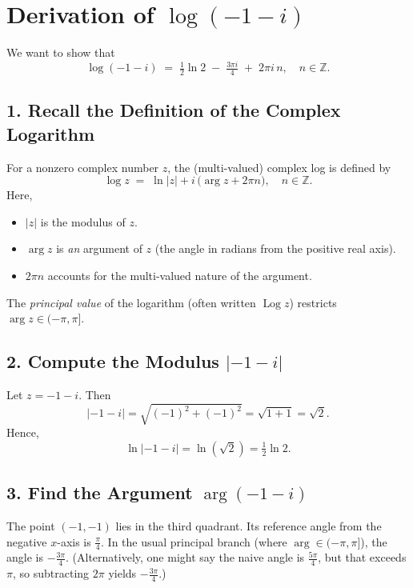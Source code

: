 \documentclass[12pt]{article}
\title{}
\author{Jerich Lee}
\date{\today}
\DeclareMathOperator{\Log}{Log}
\theoremstyle{definition} %
\theoremstyle{plain} %
\begin{document}
\maketitle
\section*{Derivation of \(\log(-1 - i)\)}

We want to show that
\[
\log(-1 - i) \;=\; \tfrac12 \ln 2 \;-\; \tfrac{3\pi i}{4} \;+\; 2\pi i\,n,
\quad n \in \mathbb{Z}.
\]

\subsection*{1. Recall the Definition of the Complex Logarithm}
For a nonzero complex number \(z\), the (multi-valued) complex log is defined by
\[
\log z \;=\; \ln |z| + i\,\bigl(\arg z + 2\pi n\bigr),
\quad n \in \mathbb{Z}.
\]
Here,
\begin{itemize}
  \item \(\lvert z\rvert\) is the modulus of \(z\).
  \item \(\arg z\) is \emph{an} argument of \(z\) (the angle in radians from the positive real axis).
  \item \(2\pi n\) accounts for the multi-valued nature of the argument.
\end{itemize}
The \emph{principal value} of the logarithm (often written \(\Log z\)) restricts \(\arg z \in (-\pi, \pi]\).

\subsection*{2. Compute the Modulus \(\lvert -1 - i\rvert\)}
Let \(z = -1 - i\). Then
\[
\lvert -1 - i\rvert 
= \sqrt{(-1)^2 + (-1)^2}
= \sqrt{1 + 1}
= \sqrt{2}.
\]
Hence,
\[
\ln\lvert -1 - i\rvert = \ln(\sqrt{2}) = \tfrac12 \ln 2.
\]

\subsection*{3. Find the Argument \(\arg(-1 - i)\)}
The point \((-1, -1)\) lies in the third quadrant. Its reference angle from the negative \(x\)-axis is \(\tfrac{\pi}{4}\).  
In the usual principal branch (where \(\arg\in(-\pi,\pi]\)), the angle is \(-\tfrac{3\pi}{4}\).  
(Alternatively, one might say the naive angle is \(\tfrac{5\pi}{4}\), but that exceeds \(\pi\), so subtracting \(2\pi\) yields \(-\tfrac{3\pi}{4}\).)
\end{document}
